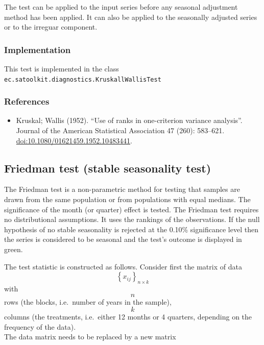 \documentclass[
  letterpaper,
  DIV=11,
  numbers=noendperiod]{scrreprt}
\providecommand{\tightlist}{%
  \setlength{\itemsep}{0pt}\setlength{\parskip}{0pt}}\usepackage{longtable,booktabs,array}
\begin{document}
The test can be applied to the input series before any seasonal
adjustment method has been applied. It can also be applied to the
seasonally adjusted series or to the irreguar component.

\hypertarget{implementation-1}{%
\subsubsection{Implementation}\label{implementation-1}}

This test is implemented in the class
\texttt{ec.satoolkit.diagnostics.KruskallWallisTest}

\hypertarget{references-1}{%
\subsubsection{References}\label{references-1}}

\begin{itemize}
\tightlist
\item
  Kruskal; Wallis (1952). ``Use of ranks in one-criterion variance
  analysis''. Journal of the American Statistical Association 47 (260):
  583--621. \url{doi:10.1080/01621459.1952.10483441}.
\end{itemize}

\hypertarget{friedman-test-stable-seasonality-test}{%
\subsection{Friedman test (stable seasonality
test)}\label{friedman-test-stable-seasonality-test}}

The Friedman test is a non-parametric method for testing that samples
are drawn from the same population or from populations with equal
medians. The significance of the month (or quarter) effect is tested.
The Friedman test requires no distributional assumptions. It uses the
rankings of the observations. If the null hypothesis of no stable
seasonality is rejected at the 0.10\% significance level then the series
is considered to be seasonal and the test's outcome is displayed in
green.

The test statistic is constructed as follows. Consider first the matrix
of data \[ \left\{x_{ij}\right\}_{n \times k} \] with \[ n \] rows (the
blocks, i.e.~number of years in the sample), \[ k \] columns (the
treatments, i.e.~either 12 months or 4 quarters, depending on the
frequency of the data).\\
The data matrix needs to be replaced by a new matrix
\end{document}
